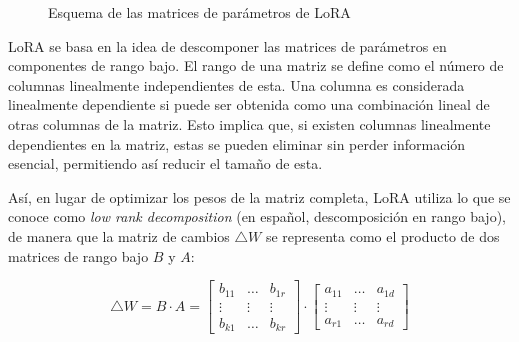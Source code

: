 \documentclass[11pt,spanish,listoffigures,listoftables]{tfgetsinf}
\begin{document}
\begin{figure}[!h]
\centering
{}
\caption{Esquema de las matrices de parámetros de LoRA}
\label{fig:matricesLoRA}
\end{figure}

LoRA se basa en la idea de descomponer las matrices de parámetros en componentes de rango bajo. El rango de una matriz se define como el número de columnas linealmente independientes de esta. Una columna es considerada linealmente dependiente si puede ser obtenida como una combinación lineal de otras columnas de la matriz. Esto implica que, si existen columnas linealmente dependientes en la matriz, estas se pueden eliminar sin perder información esencial, permitiendo así reducir el tamaño de esta.

Así, en lugar de optimizar los pesos de la matriz completa, LoRA utiliza lo que se conoce como \textit{low rank decomposition} (en español, descomposición en rango bajo), de manera que la matriz de cambios $\bigtriangleup W$ se representa como el producto de dos matrices de rango bajo $B$ y $A$:

\begin{equation}
\bigtriangleup W = B \cdot A =
\begin{bmatrix}
b_{11} & \dots & b_{1r} \\
\vdots &  \vdots & \vdots \\
b_{k1} & \dots & b_{kr}
\end{bmatrix}
\cdot
\begin{bmatrix}
a_{11} & \dots & a_{1d} \\
\vdots & \vdots & \vdots \\
a_{r1} & \dots & a_{rd}
\end{bmatrix}
\end{equation}
\end{document}
